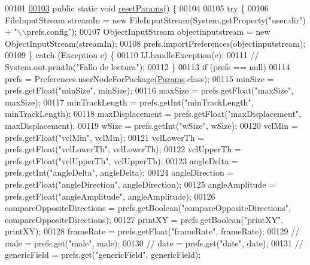 \begin{DoxyCode}
00101 
\hypertarget{_params_8java_source_l00103}{}\hyperlink{classdata_1_1_params_a0a4fc9bb0ad6624d84e20d1cd9644187}{00103}   \textcolor{keyword}{public} \textcolor{keyword}{static} \textcolor{keywordtype}{void} \hyperlink{classdata_1_1_params_a0a4fc9bb0ad6624d84e20d1cd9644187}{resetParams}() \{
00104 
00105     \textcolor{keywordflow}{try} \{
00106       FileInputStream streamIn = \textcolor{keyword}{new} FileInputStream(System.getProperty(\textcolor{stringliteral}{"user.dir"}) + \textcolor{stringliteral}{"\(\backslash\)\(\backslash\)prefs.config"});
00107       ObjectInputStream objectinputstream = \textcolor{keyword}{new} ObjectInputStream(streamIn);
00108       prefs.importPreferences(objectinputstream);
00109     \} \textcolor{keywordflow}{catch} (Exception e) \{
00110       IJ.handleException(e);
00111 \textcolor{comment}{//      System.out.println("Fallo de lectura");}
00112     \}
00113     \textcolor{keywordflow}{if} (prefs == null)
00114       prefs = Preferences.userNodeForPackage(\hyperlink{classdata_1_1_params}{Params}.class);
00115     minSize = prefs.getFloat(\textcolor{stringliteral}{"minSize"}, minSize);
00116     maxSize = prefs.getFloat(\textcolor{stringliteral}{"maxSize"}, maxSize);
00117     minTrackLength = prefs.getInt(\textcolor{stringliteral}{"minTrackLength"}, minTrackLength);
00118     maxDisplacement = prefs.getFloat(\textcolor{stringliteral}{"maxDisplacement"}, maxDisplacement);
00119     wSize = prefs.getInt(\textcolor{stringliteral}{"wSize"}, wSize);
00120     vclMin = prefs.getFloat(\textcolor{stringliteral}{"vclMin"}, vclMin);
00121     vclLowerTh = prefs.getFloat(\textcolor{stringliteral}{"vclLowerTh"}, vclLowerTh);
00122     vclUpperTh = prefs.getFloat(\textcolor{stringliteral}{"vclUpperTh"}, vclUpperTh);
00123     angleDelta = prefs.getInt(\textcolor{stringliteral}{"angleDelta"}, angleDelta);
00124     angleDirection = prefs.getFloat(\textcolor{stringliteral}{"angleDirection"}, angleDirection);
00125     angleAmplitude = prefs.getFloat(\textcolor{stringliteral}{"angleAmplitude"}, angleAmplitude);
00126     compareOppositeDirections = prefs.getBoolean(\textcolor{stringliteral}{"compareOppositeDirections"}, compareOppositeDirections);
00127     printXY = prefs.getBoolean(\textcolor{stringliteral}{"printXY"}, printXY);
00128     frameRate = prefs.getFloat(\textcolor{stringliteral}{"frameRate"}, frameRate);
00129 \textcolor{comment}{//    male = prefs.get("male", male);}
00130 \textcolor{comment}{//    date = prefs.get("date", date);}
00131 \textcolor{comment}{//    genericField = prefs.get("genericField", genericField);}

\end{DoxyCode}
